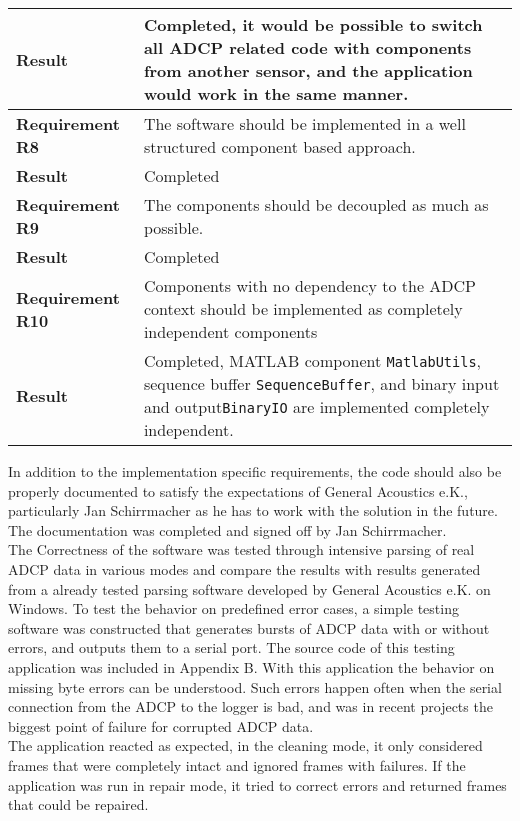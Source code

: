 \begin{tabular}{|l|l|}
  	\textbf{Result} & Completed, it would be possible to switch all ADCP related code with components from another sensor, and the application would work in the same manner.\\
  \hline
  \hline
  	\textbf{Requirement R8} &  The software should be implemented in a well structured component based approach.\\ \hline
  	\textbf{Result} & Completed \\
  \hline
  \hline
  	\textbf{Requirement R9} & The components should be decoupled as much as possible.\\ \hline
  	\textbf{Result} & Completed \\
  \hline
  \hline
  	\textbf{Requirement R10} & Components with no dependency to the ADCP context should be implemented as completely independent components\\ \hline
  	\textbf{Result} & Completed, MATLAB component \texttt{MatlabUtils}, sequence buffer \texttt{SequenceBuffer}, and binary input and output\texttt{BinaryIO} are implemented completely independent.\\
  \hline
\end{tabular}

In addition to the implementation specific requirements, the code should also be properly documented to satisfy the expectations of General Acoustics e.K., particularly Jan Schirrmacher as he has to work with the solution in the future. The documentation was completed and signed off by Jan Schirrmacher.\\
The Correctness of the software was tested through intensive parsing of real ADCP data in various modes and compare the results with results generated from a already tested parsing software developed by General Acoustics e.K. on Windows. To test the behavior on predefined error cases, a simple testing software was constructed that generates bursts of ADCP data with or without errors, and outputs them to a serial port. The source code of this testing application was included in Appendix B. With this application the behavior on missing byte errors can be understood. Such errors happen often when the serial connection from the ADCP to the logger is bad, and was in recent projects the biggest point of failure for corrupted ADCP data.\\
The application reacted as expected, in the cleaning mode, it only considered frames that were completely intact and ignored frames with failures. If the application was run in repair mode, it tried to correct errors and returned frames that could be repaired.\\


